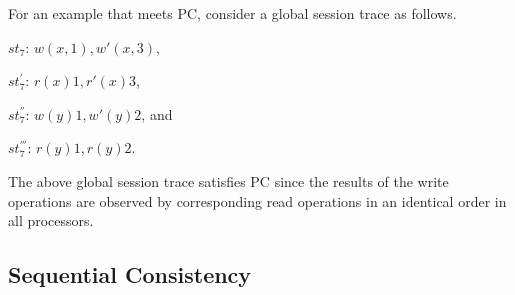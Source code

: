 \documentclass[journal,compsoc]{IEEEtran}
\begin{document}
    For an example that meets PC, consider a global session trace as follows.   
    
    $\mathit{st}_7$: $w(x,1), w'(x,3)$, 
    
    $\mathit{st}_7^{'}$:  $ r(x){1}, r'(x){3}$,    %
    
    
    $\mathit{st}_7^{''}$: 
  $w(y){1}, w'(y){2}$, and 
  
  $\mathit{st}_7^{'''}$: 
  $r(y){1}, r(y){2}$. %


  The above global session trace satisfies PC %
   since the results of the write operations are observed by corresponding read operations in an identical order in all processors. 
\subsection{Sequential Consistency}
\end{document}
